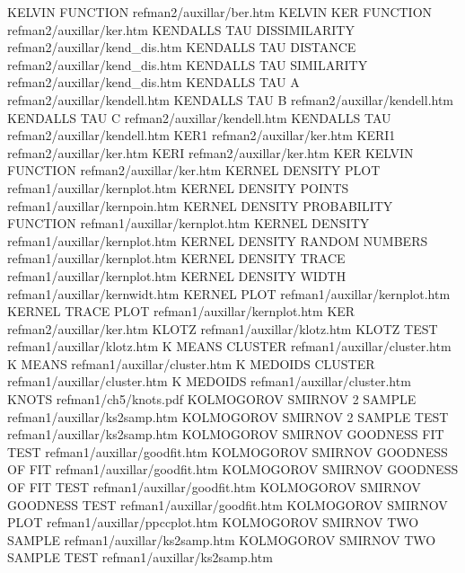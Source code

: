 KELVIN FUNCTION                         refman2/auxillar/ber.htm
KELVIN KER FUNCTION                     refman2/auxillar/ker.htm
KENDALLS TAU DISSIMILARITY              refman2/auxillar/kend_dis.htm
KENDALLS TAU DISTANCE                   refman2/auxillar/kend_dis.htm
KENDALLS TAU SIMILARITY                 refman2/auxillar/kend_dis.htm
KENDALLS TAU A                          refman2/auxillar/kendell.htm
KENDALLS TAU B                          refman2/auxillar/kendell.htm
KENDALLS TAU C                          refman2/auxillar/kendell.htm
KENDALLS TAU                            refman2/auxillar/kendell.htm
KER1                                    refman2/auxillar/ker.htm
KERI1                                   refman2/auxillar/ker.htm
KERI                                    refman2/auxillar/ker.htm
KER KELVIN FUNCTION                     refman2/auxillar/ker.htm
KERNEL DENSITY PLOT                     refman1/auxillar/kernplot.htm
KERNEL DENSITY POINTS                   refman1/auxillar/kernpoin.htm
KERNEL DENSITY PROBABILITY FUNCTION     refman1/auxillar/kernplot.htm
KERNEL DENSITY                          refman1/auxillar/kernplot.htm
KERNEL DENSITY RANDOM NUMBERS           refman1/auxillar/kernplot.htm
KERNEL DENSITY TRACE                    refman1/auxillar/kernplot.htm
KERNEL DENSITY WIDTH                    refman1/auxillar/kernwidt.htm
KERNEL PLOT                             refman1/auxillar/kernplot.htm
KERNEL TRACE PLOT                       refman1/auxillar/kernplot.htm
KER                                     refman2/auxillar/ker.htm
KLOTZ                                   refman1/auxillar/klotz.htm
KLOTZ TEST                              refman1/auxillar/klotz.htm
K MEANS CLUSTER                         refman1/auxillar/cluster.htm
K MEANS                                 refman1/auxillar/cluster.htm
K MEDOIDS CLUSTER                       refman1/auxillar/cluster.htm
K MEDOIDS                               refman1/auxillar/cluster.htm
KNOTS                                   refman1/ch5/knots.pdf
KOLMOGOROV SMIRNOV 2 SAMPLE             refman1/auxillar/ks2samp.htm
KOLMOGOROV SMIRNOV 2 SAMPLE TEST        refman1/auxillar/ks2samp.htm
KOLMOGOROV SMIRNOV GOODNESS FIT TEST    refman1/auxillar/goodfit.htm
KOLMOGOROV SMIRNOV GOODNESS OF FIT      refman1/auxillar/goodfit.htm
KOLMOGOROV SMIRNOV GOODNESS OF FIT TEST refman1/auxillar/goodfit.htm
KOLMOGOROV SMIRNOV GOODNESS TEST        refman1/auxillar/goodfit.htm
KOLMOGOROV SMIRNOV PLOT                 refman1/auxillar/ppccplot.htm
KOLMOGOROV SMIRNOV TWO SAMPLE           refman1/auxillar/ks2samp.htm
KOLMOGOROV SMIRNOV TWO SAMPLE TEST      refman1/auxillar/ks2samp.htm
